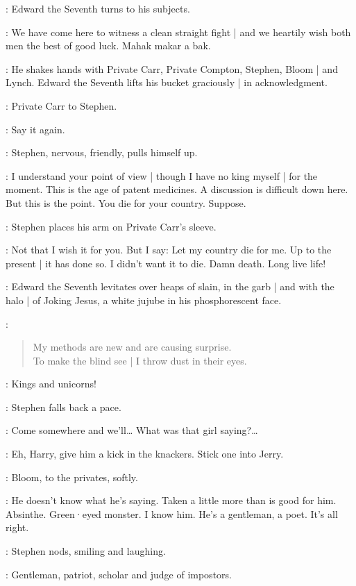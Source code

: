 :
Edward the Seventh turns to his subjects.

\EdwardSeventh:
We have come here to witness a clean straight fight |
and we heartily wish both men the best of good luck.
Mahak makar a bak.

:
He shakes hands with Private Carr,
Private Compton,
Stephen,
Bloom |
and Lynch.
Edward the Seventh lifts his bucket graciously |
in acknowledgment.

:
Private Carr to Stephen.

\Carr:
Say it again.

:
Stephen,
nervous,
friendly,
pulls himself up.

\Stephen:
I understand your point of view |
though I have no king myself |
for the moment.
%
This is the age of patent medicines.
A discussion is difficult down here.
But this is the point.
You die for your country.
Suppose.

:
Stephen places his arm on Private Carr's sleeve.

\Stephen:
Not that I wish it for you.
But I say:
Let my country die for me.
Up to the  present |
it has done so.
I didn't want it to die.
Damn death.
Long live life!

:
Edward the Seventh levitates over heaps of slain,
in the garb |
and with the halo |
of Joking Jesus,
a white jujube in his phosphorescent face.

\EdwardSeventh:
\begin{verse}
    My methods are new and are causing surprise.\\
    To make the blind see |
        I throw dust in their eyes.
\end{verse}

\Stephen:
Kings and unicorns!

:
Stephen falls back a pace.

\Stephen:
Come somewhere and we'll… 
What was that girl saying?…

\Compton[2]:
Eh,
Harry,
give him a kick in the knackers.
Stick one into Jerry.

:
Bloom,
to the privates,
softly.

\Bloom:
He doesn't know what he's saying.
Taken a little more than is good for him.
Absinthe.
Green·eyed monster.
I know him.
He's a gentleman,
a poet.
It's all right.

:
Stephen nods,
smiling and laughing.

\Stephen:
Gentleman,
patriot,
scholar and judge of impostors.

